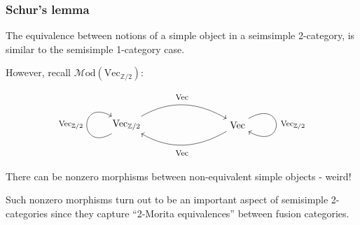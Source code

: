 \documentclass{beamer}
\newcommand{\ZZ}{{\mathbb{Z}}}
\newcommand{\Vect}{{\textrm{Vec}}}
\newcommand{\Mod}{{\mathcal{M}\textrm{od}}}
\newcommand{\ModA}[1]{{\Mod(#1)}}
\begin{document}
\begin{frame}
\frametitle{Schur's lemma}

The equivalence between notions of a simple object
in a seimsimple 2-category,
is similar to the semisimple 1-category case.

\pause

However, recall $\ModA{\Vect_{\ZZ/2}}$:

\[
\begin{tikzpicture}
\node (a) at (0,0) {$\Vect_{\ZZ/2}$};
\node (b) at (4,0) {$\Vect$};
\draw[->] (a) to[out=30,in=150] (b);
\node at (2,1) {\footnotesize $\Vect$};
\draw[->] (b) to[out=-150,in=-30] (a);
\node at (2,-1) {\footnotesize $\Vect$};
\draw[->] (a) .. controls +(-150:2cm) and +(150:2cm) .. (a);
\node at (-2,0) {\footnotesize $\Vect_{\ZZ/2}$};
\draw[->] (b) .. controls +(30:2cm) and +(-30:2cm) .. (b);
\node at (6,0) {\footnotesize $\Vect_{\ZZ/2}$};
\end{tikzpicture}
\]

\pause

There can be nonzero morphisms between
non-equivalent simple objects - weird!

\pause

Such nonzero morphisms turn out to be
an important aspect of semisimple 2-categories since
they capture ``2-Morita equivalences'' between fusion categories.


\end{frame}
\end{document}
